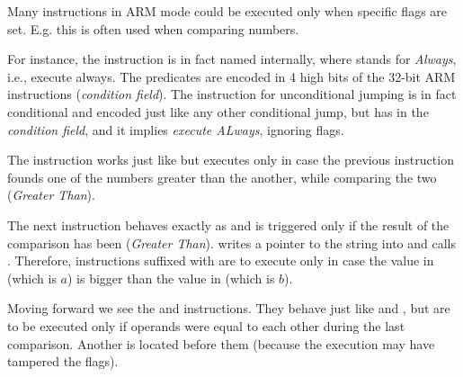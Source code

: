 \label{subsec:jcc_ARM}

\mysubparagraph{\OptimizingKeilVI (\ARMMode)}




Many instructions in ARM mode could be executed only when specific flags are set.
E.g. this is often used when comparing numbers.


For instance, the \ADD instruction is in fact named  internally, where  stands for
\emph{Always}, i.e., execute always.
The predicates are encoded in 4 high bits of the 32-bit ARM instructions (\emph{condition field}).
The  instruction for unconditional jumping is in fact conditional and encoded just like any other
conditional jump, but has  in the \emph{condition field}, and it implies \emph{execute ALways}, 
ignoring flags.


The  instruction works just like  but executes only in case the previous \CMP
instruction founds one of the numbers greater than the another, while comparing the two (\emph{Greater Than}).


The next  instruction behaves exactly as  
and is triggered only if the result of the comparison has been (\emph{Greater Than}). 
 writes a pointer to the string  into  and  calls \printf.
Therefore, instructions suffixed with  are to execute only in case the value in  (which is $a$) is bigger than the value in  (which is $b$).


Moving forward we see the  and  instructions.
They behave just like  and , but are to be executed only if operands were equal to each
other during the last comparison.
Another \CMP is located before them (because the \printf execution may have tampered the flags).

